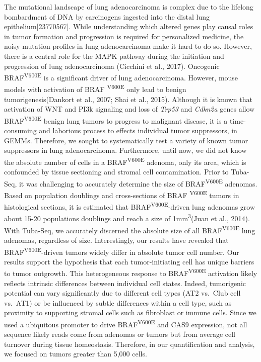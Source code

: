 The mutational landscape of lung adenocarcinoma is complex due to the lifelong bombardment of DNA by carcinogens ingested into the distal lung epithelium{[}23770567{]}.
While understanding which altered genes play causal roles in tumor formation and progression is required for personalized medicine, the noisy mutation profiles in lung adenocarcinoma make it hard to do so.
However, there is a central role for the MAPK pathway during the initiation and progression of lung adenocarcinoma (Cicchini et al., 2017).
Oncogenic BRAF\textsuperscript{V600E} is a significant driver of lung adenocarcinoma.
However, mouse models with activation of BRAF \textsuperscript{V600E} only lead to benign tumorigenesis(Dankort et al., 2007; Shai et al., 2015).
Although it is known that activation of WNT and PI3k signaling and loss of \emph{Trp53} and \emph{Cdkn2a} genes allow BRAF\textsuperscript{V600E} benign lung tumors to progress to malignant disease, it is a time-consuming and laborious process to effects individual tumor suppressors, in GEMMs.
Therefore, we sought to systematically test a variety of known tumor suppressors in lung adenocarcinoma.
Furthermore, until now, we did not know the absolute number of cells in a BRAF\textsuperscript{V600E} adenoma, only its area, which is confounded by tissue sectioning and stromal cell contamination.
Prior to Tuba-Seq, it was challenging to accurately determine the size of BRAF\textsuperscript{V600E} adenomas.
Based on population doublings and cross-sections of BRAF \textsuperscript{V600E} tumors in histological sections, it is estimated that BRAF\textsuperscript{V600E}-driven lung adenomas grow about 15-20 populations doublings and reach a size of 1mm\textsuperscript{3}(Juan et al., 2014).
With Tuba-Seq, we accurately discerned the absolute size of all BRAF\textsuperscript{V600E} lung adenomas, regardless of size.
Interestingly, our results have revealed that BRAF\textsuperscript{V600E}-driven tumors widely differ in absolute tumor cell number. Our results support the hypothesis that each tumor-initiating cell has unique barriers to tumor outgrowth.
This heterogeneous response to BRAF\textsuperscript{V600E} activation likely reflects intrinsic differences between individual cell states.
Indeed, tumorigenic potential can vary significantly due to different cell types (AT2 vs.~Club cell vs.~AT1) or be influenced by subtle differences within a cell type, such as proximity to supporting stromal cells such as fibroblast or immune cells.
Since we used a ubiquitous promoter to drive BRAF\textsuperscript{V600E} and CAS9 expression, not all sequence likely reads come from adenomas or tumors but from average cell turnover during tissue homeostasis.
Therefore, in our quantification and analysis, we focused on tumors greater than 5,000 cells.

